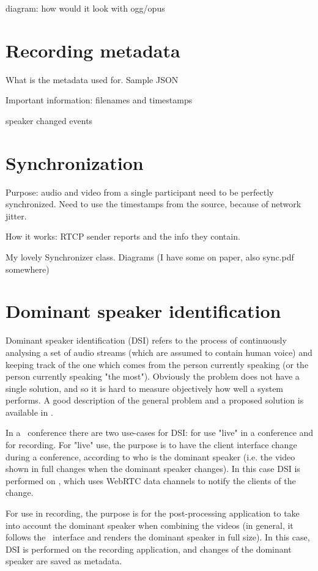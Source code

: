 \documentclass[twoside,openright,a4paper,11pt,english]{article}
\begin{document}
diagram: how would it look with ogg/opus
\section{Recording metadata}
\label{recording-metadata}
What is the metadata used for. Sample JSON

Important information: filenames and timestamps

speaker changed events


\section{Synchronization}
Purpose: audio and video from a single participant need to be perfectly synchronized. Need to use the timestamps from the source, because of network jitter. 

How it works: RTCP sender reports and the info they contain.

My lovely Synchronizer class. Diagrams (I have some on paper, also sync.pdf somewhere)

\section{Dominant speaker identification}
\label{dsd}
Dominant speaker identification (DSI) refers to the process of continuously analysing a set of audio streams
(which are assumed to contain human voice) and keeping track of the one which
comes from the person currently speaking (or the person currently speaking "the
most"). Obviously the problem does not have a single solution, and so it is hard
to measure objectively how well a system performs. A good description of the
general problem and a proposed solution is available in \cite{volfin2012}. 

In a \jm\ conference there are two use-cases for DSI: for use "live" in a
conference and for recording. 
For "live" use, the purpose is to have the client interface change during a
conference, according to who is the dominant speaker (i.e. the video shown in
full changes when the dominant speaker changes). In this case DSI is performed
on \jvb, which uses WebRTC data channels to notify the clients of the change.

For use in recording, the purpose is for the post-processing application to
take into account the dominant speaker when combining the videos (in general,
it follows the \jm\ interface and renders the dominant speaker in full size).
In this case, DSI is performed on the recording application, and changes of
the dominant speaker are saved as metadata.
\end{document}
